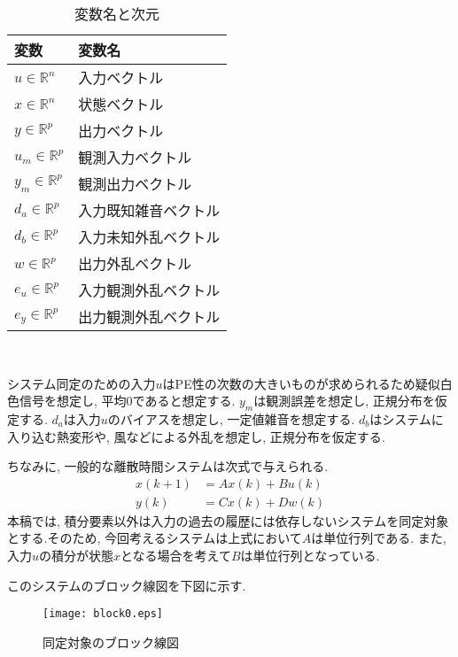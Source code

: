 \documentclass[a4paper,12pt]{jbook}
\begin{document}
\begin{table}[htb]
  \begin{center}
    \begin{tabular}{|l|l|}
     \hline
      変数 & 変数名 \\ \hline \hline
      $u \in \mathbb{R}^n$ & 入力ベクトル \\ \hline
      $x \in \mathbb{R}^n$ & 状態ベクトル \\ \hline
      $y \in \mathbb{R}^p$ & 出力ベクトル \\ \hline
      $u_m \in \mathbb{R}^p$ & 観測入力ベクトル \\ \hline
      $y_m \in \mathbb{R}^p$ & 観測出力ベクトル \\ \hline
      $d_a \in \mathbb{R}^p$ & 入力既知雑音ベクトル \\ \hline
      $d_b \in \mathbb{R}^p$ & 入力未知外乱ベクトル \\ \hline
      $w \in \mathbb{R}^p$ & 出力外乱ベクトル \\ \hline
      $e_u \in \mathbb{R}^p$ & 入力観測外乱ベクトル \\ \hline
      $e_y \in \mathbb{R}^p$ & 出力観測外乱ベクトル \\ \hline
    \end{tabular}
　 \caption{変数名と次元} 
  \end{center}
\end{table}
システム同定のための入力$u$はPE性の次数の大きいものが求められるため疑似白色信号を想定し, 平均$0$であると想定する. $y_m$は観測誤差を想定し, 正規分布を仮定する. $d_a$は入力$u$のバイアスを想定し, 一定値雑音を想定する. $d_b$はシステムに入り込む熱変形や, 風などによる外乱を想定し, 正規分布を仮定する.

ちなみに, 一般的な離散時間システムは次式で与えられる.
\begin{align}
 x(k+1) &= A x(k) + B u(k) \label{eqn:sys1} \\
 y(k) &= C x(k) + D w(k) \label{eqn:sys2}
\end{align}
本稿では, 積分要素以外は入力の過去の履歴には依存しないシステムを同定対象とする.そのため, 今回考えるシステムは上式において$A$は単位行列である. また, 入力$u$の積分が状態$x$となる場合を考えて$B$は単位行列となっている.

\newpage
このシステムのブロック線図を下図に示す.\\
\begin{figure}[htbp]
 \begin{center}
  \texttt{[image: block0.eps]}
 \end{center}
 \caption{同定対象のブロック線図}
 \label{fig:block0}
\end{figure}\\
\end{document}
